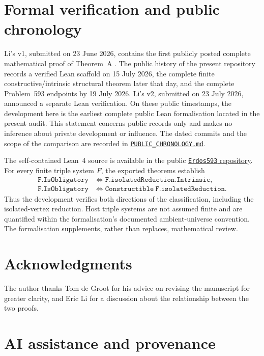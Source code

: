 \documentclass[a4paper,11pt,reqno]{amsart}
\theoremstyle{plain}
\theoremstyle{definition}
\theoremstyle{remark}
\begin{document}
\section*{Formal verification and public chronology}

Li's v1, submitted on 23 June 2026, contains the first publicly posted complete
mathematical proof of Theorem~A \citep[Theorem~1.1]{li2026}.  The public history
of the present repository records a verified Lean scaffold on 15 July 2026, the
complete finite constructive/intrinsic structural theorem later that day, and
the complete Problem~593 endpoints by 19 July 2026.  Li's v2, submitted on
23 July 2026, announced a separate Lean verification.  On these public
timestamps, the development here is the earliest complete public Lean
formalisation located in the present audit.  This statement concerns public
records only and makes no inference about private development or influence.
The dated commits and the scope of the comparison are recorded in
\href{https://github.com/SamPetkov/Erdos593/blob/main/PUBLIC_CHRONOLOGY.md}{\texttt{PUBLIC\_CHRONOLOGY.md}}.

The self-contained Lean~4 source is available in the public
\href{https://github.com/SamPetkov/Erdos593/blob/main/formalization/Erdos593SelfContained.lean}{\texttt{Erdos593} repository}.
For every finite triple system $F$, the exported theorems establish
\[
\begin{aligned}
\mathtt{F.IsObligatory}
&\Longleftrightarrow \mathtt{F.isolatedReduction.Intrinsic},\\
\mathtt{F.IsObligatory}
&\Longleftrightarrow \mathtt{Constructible\ F.isolatedReduction}.
\end{aligned}
\]
Thus the development verifies both directions of the classification, including
the isolated-vertex reduction.  Host triple systems are not assumed finite and
are quantified within the formalisation's documented ambient-universe
convention.  The formalisation supplements, rather than replaces, mathematical
review.

\section*{Acknowledgments}

The author thanks Tom de Groot for his advice on revising the manuscript for
greater clarity, and Eric Li for a discussion about the relationship between
the two proofs.

\section*{AI assistance and provenance}
\end{document}
